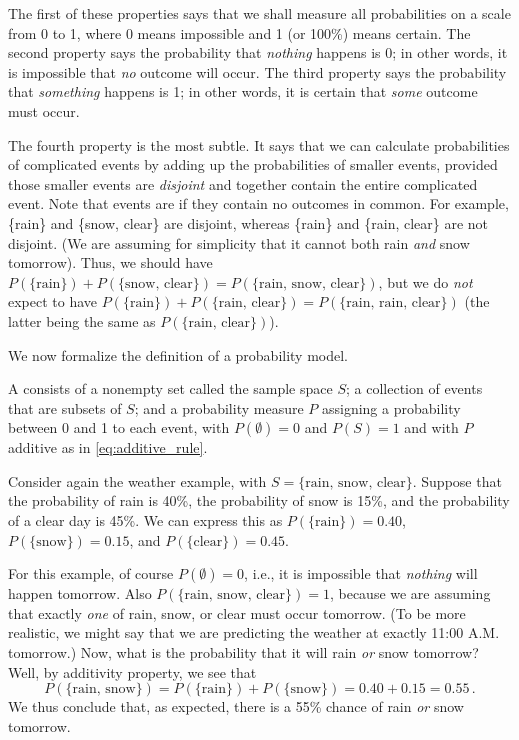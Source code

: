The first of these properties says that we shall measure all probabilities on a scale from 0 to 1, where 0 means
impossible and 1 (or 100\%) means certain. The second property says the probability that \emph{nothing} happens is 0;
in other words, it is impossible that \emph{no} outcome will occur. The third property says the probability that
\emph{something} happens is 1; in other words, it is certain that \emph{some} outcome must occur.

The fourth property is the most subtle. It says that we can calculate probabilities of complicated events by adding
up  the probabilities of smaller events, provided those smaller events are \emph{disjoint} and together contain the
entire complicated event. Note that events  are  if they contain no outcomes in
common. For example, \{rain\} and \{snow, clear\} are disjoint, whereas \{rain\} and \{rain, clear\} are not
disjoint. (We are assuming for simplicity that it cannot both rain \emph{and} snow tomorrow). Thus, we should have
$P(\{\text{rain}\}) + P(\{\text{snow, clear}\}) = P(\{\text{rain, snow, clear}\})$, but we do \emph{not} expect to
have $P(\{\text{rain}\}) + P(\{\text{rain, clear}\}) = P(\{\text{rain, rain, clear}\})$ (the latter being the same as
$P(\{\text{rain, clear}\})$).

We now formalize the definition of a probability model.
\begin{definition}
    A     consists of a nonempty set called the sample space $S$; a collection of events that
    are subsets of $S$; and a probability measure $P$ assigning a probability between 0 and 1 to each event, with
    $P(\emptyset)=0$ and $P(S)=1$ and with $P$ additive as in \eqref{eq:additive_rule}.
\end{definition}

\begin{example}
    Consider again the weather example, with $S = \{\text{rain, snow, clear}\}$. Suppose that the probability of rain
    is 40\%, the probability of snow is 15\%, and the probability of a clear day is 45\%. We can express this as
    $P(\{\text{rain}\})=0.40$, $P(\{\text{snow}\})=0.15$, and $P(\{\text{clear}\})=0.45$.

    For this example, of course $P(\emptyset)=0$, i.e., it is impossible that \emph{nothing} will happen tomorrow.
    Also $P(\{\text{rain, snow, clear}\})=1$, because we are assuming that exactly \emph{one} of rain, snow, or clear
    must occur tomorrow. (To be more realistic, we might say that we are predicting the weather at exactly 11:00 A.M.
    tomorrow.) Now, what is the probability that it will rain \emph{or} snow tomorrow? Well, by additivity property,
    we see that
    $$
    P(\{\text{rain, snow}\}) = P(\{\text{rain}\}) + P(\{\text{snow}\}) = 0.40 + 0.15 = 0.55\,.
    $$
    We thus conclude that, as expected, there is a 55\% chance of rain \emph{or} snow tomorrow.
\end{example}

